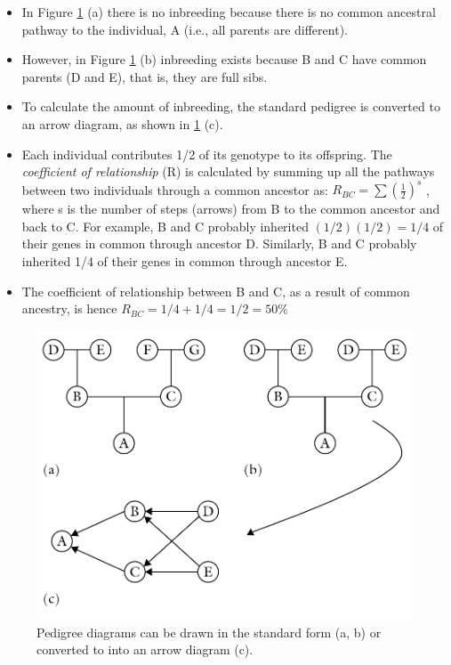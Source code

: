 \documentclass[11pt,ignorenonframetext,aspectratio=169]{beamer}
\providecommand{\tightlist}{%
  \setlength{\itemsep}{0pt}\setlength{\parskip}{0pt}}
\begin{document}
\begin{frame}{}
\protect\hypertarget{section-3}{}
\begin{itemize}
\tightlist
\item
  In Figure \ref{fig:inbreeding-coefficient} (a) there is no inbreeding
  because there is no common ancestral pathway to the individual, A
  (i.e., all parents are different).
\item
  However, in Figure \ref{fig:inbreeding-coefficient} (b) inbreeding
  exists because B and C have common parents (D and E), that is, they
  are full sibs.
\item
  To calculate the amount of inbreeding, the standard pedigree is
  converted to an arrow diagram, as shown in
  \ref{fig:inbreeding-coefficient} (c).
\item
  Each individual contributes 1/2 of its genotype to its offspring. The
  \emph{coefficient of relationship} (R) is calculated by summing up all
  the pathways between two individuals through a common ancestor as:
  \(R_{BC} = \sum{\left(\frac{1}{2}\right)^s}\) , where s is the number
  of steps (arrows) from B to the common ancestor and back to C. For
  example, B and C probably inherited \((1/2)(1/2) = 1/4\) of their
  genes in common through ancestor D. Similarly, B and C probably
  inherited 1/4 of their genes in common through ancestor E.
\item
  The coefficient of relationship between B and C, as a result of common
  ancestry, is hence \(R_{BC} = 1/4 + 1/4 = 1/2 = 50\%\)
\end{itemize}
\end{frame}

\begin{frame}{}
\protect\hypertarget{section-4}{}
\begin{figure}

{\centering \includegraphics[width=0.6\linewidth]{./images/arrow_diagram} 

}

\caption{Pedigree diagrams can be drawn in the standard form (a, b) or converted to into an arrow diagram (c).}\label{fig:inbreeding-coefficient}
\end{figure}
\end{frame}
\end{document}
